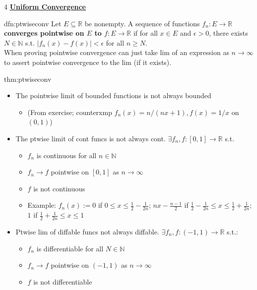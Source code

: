 \documentclass[landscape, 8pt]{extarticle}
\begin{document}
\begin{multicols*}{4}
		{\tiny \textbf{\underline{Uniform Convergence}}}	
		
		
		
		\begin{dfn}{dfn:ptwiseconv}{ }
		Let $E \subseteq \mathbb{R}$ be nonempty. A sequence of functions $f_n: E \to \mathbb{R}$ \textbf{converges pointwise on $E$ to $f: E \to \mathbb{R}$} if for all $x\in E$ and $ \epsilon > 0$, there exists $N\in \mathbb{N}$ s.t. $\left|f_n(x) - f(x)\right| <\epsilon$ for all $n \ge N$.\\
		When proving pointwise convergence can just take lim of an expression as $n \to \infty$ to assert pointwise convergence to the lim (if it exists). 
		
		\end{dfn}
		
		
		\begin{thm}{thm:ptwiseconv}{ }
		\begin{itemize}[label=*]
			\item The pointwise limit of bounded functions is not always bounded
			\begin{itemize}
				\item (From exercise; counterxmp $f_n(x) = n/(nx + 1), f(x) = 1/x$ on $(0,1)$)
			\end{itemize}
			\item The ptwise limit of cont funcs is not always cont. $\exists f_n, f: [0,1] \to \mathbb{R}$ s.t.
			\begin{itemize}
				\item $f_n$ is continuous for all $n \in \mathbb{N}$
				\item $f_n \to f$ pointwise on $[0, 1]$ as $n \to \infty$
				\item $f$ is not continuous
				\item Example: $f_n(x) := 0$ if $ 0 \le x \le \frac{1}{2} - \frac{1}{2n}$; $nx - \frac{n-1}{2}$ if $ \frac{1}{2} - \frac{1}{2n} \le x \le \frac{1}{2}+ \frac{1}{2n}$; $1$ if $\frac{1}{2} + \frac{1}{2n} \le x \le 1$
			\end{itemize}
			\item Ptwise lim of diffable funcs not always diffable. $\exists f_n, f: (-1, 1) \to \mathbb{R}$ s.t.:
			\begin{itemize}
				\item $f_n$ is differentiable for all $N \in \mathbb{N}$
				\item $f_n \to f$ pointwise on $(-1, 1)$ as $n \to \infty$
				\item $f$ is not differentiable

\end{itemize}
\end{itemize}
\end{thm}
\end{multicols*}
\end{document}
